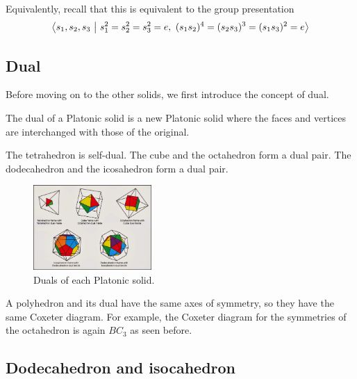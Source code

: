 \documentclass[../main.tex]{subfiles}
\begin{document}
Equivalently, recall that this is equivalent to the group presentation
\[
\abr{s_1,s_2,s_3 \ \middle| \ s_1^2 = s_2^2 = s_3^2 = e, \ (s_1s_2)^4 = (s_2s_3)^3 = (s_1s_3)^2 = e}
\]

\subsection{Dual}
Before moving on to the other solids, we first introduce the concept of dual.
\begin{definition}
   The dual of a Platonic solid is a new Platonic solid where the faces and vertices are interchanged with those of the original. 
\end{definition}

\begin{remark}
    The tetrahedron is self-dual. The cube and the octahedron form a dual pair. The dodecahedron and the icosahedron form a dual pair.
\end{remark}
\begin{figure}[ht]
    \centering
    \includegraphics[width=0.4\textwidth]{PlatonicSolidsDual.jpg}
    \caption{Duals of each Platonic solid.}
    \label{}
\end{figure}

\begin{remark}
A polyhedron and its dual have the same axes of symmetry, so they have the same Coxeter diagram. For example, the Coxeter diagram for the symmetries of the octahedron is again $BC_{3}$ as seen before.   
\end{remark}

\subsection{Dodecahedron and isocahedron}
\end{document}
